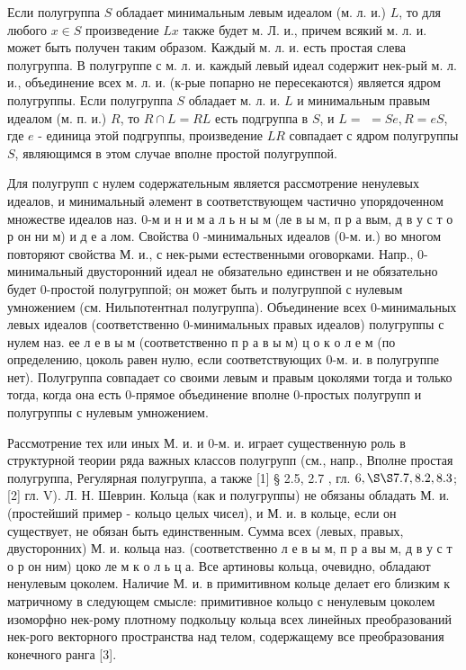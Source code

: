\documentclass[10pt]{article}
\begin{document}
Если полугруппа $S$ обладает минимальным левым идеалом (м. л. и.) $L$, то для любого $x \in S$ произведение $L x$ также будет м. Л. и., причем всякий м. л. и. может быть получен таким образом. Каждый м. л. и. есть простая слева полугруппа. В полугруппе с м. л. и. каждый левый идеал содержит нек-рый м. л. и., объединение всех м. л. и. (к-рые попарно не пересекаются) является ядром полугруппы. Если полугруппа $S$ обладает м. л. и. $L$ и минимальным правым идеалом (м. п. и.) $R$, то $R \cap L=R L$ есть подгруппа в $S$, и $L=$ $=S e, R=e S$, где $e$ - единица этой подгруппы, произведение $L R$ совпадает с ядром полугруппы $S$, являющимся в этом случае вполне простой полугруппой.



Для полугрупп с нулем содержательным является рассмотрение ненулевых идеалов, и минимальный әлемент в соответствующем частично упорядоченном множестве идеалов наз. 0-м и н и м а л ь н ы м (ле в ы м, п р а вым, д в у с т о р он ни м) и д е а лом. Свойства 0 -минимальных идеалов (0-м. и.) во многом повторяют свойства М. и., с нек-рыми естественными оговорками. Напр., 0-минимальный двусторонний идеал не обязательно единствен и не обязательно будет 0-простой полугруппой; он может быть и полугруппой с нулевым умножением (см. Нильпотентнал полугруппа). Объединение всех 0-минимальных левых идеалов (соответственно 0-минимальных правых идеалов) полугруппы с нулем наз. ее л е в ы м (соответственно п р а в ы м) ц о к о л е м (по определению, цоколь равен нулю, если соответствующих 0-м. и. в полугруппе нет). Полугруппа совпадает со своими левым и правым цоколями тогда и только тогда, когда она есть 0-прямое объединение вполне 0-простых полугрупп и полугруппы с нулевым умножением.



Рассмотрение тех или иных М. и. и 0-м. и. играет существенную роль в структурной теории ряда важных классов полугрупп (см., напр., Вполне простая полугруппа, Регулярная полугруппа, а также [1] § 2.5, 2.7 , гл. $6, \S \S 7.7,8.2,8.3$; [2] гл. V). Л. Н. Шеврин. Кольца (как и полугруппы) не обязаны обладать М. и. (простейший пример - кольцо целых чисел), и М. и. в кольце, если он существует, не обязан быть единственным. Сумма всех (левых, правых, двусторонних) М. и. кольца наз. (соответственно л е в ы м, п р а вы м, д в у с т о р он ним) цоко ле м к о л ь ц а. Все артиновы кольца, очевидно, обладают ненулевым цоколем. Наличие М. и. в примитивном кольце делает его близким к матричному в следующем смысле: примитивное кольцо с ненулевым цоколем изоморфно нек-рому плотному подкольцу кольца всех линейных преобразований нек-рого векторного пространства над телом, содержащему все преобразования конечного ранга [3].
\end{document}
